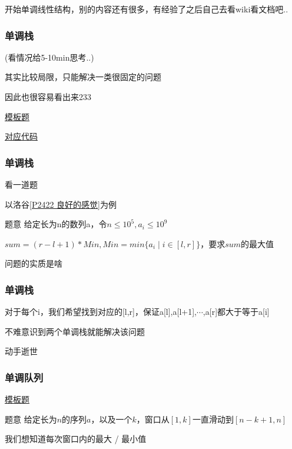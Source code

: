 \documentclass{beamer}
\begin{document}
  \begin{frame}

    开始单调线性结构，别的内容还有很多，有经验了之后自己去看wiki看文档吧..
    
    \vspace*{1\baselineskip}

    \frametitle{单调栈}

    (看情况给5-10min思考..)

    其实比较局限，只能解决一类很固定的问题

    因此也很容易看出来233

    \vspace*{1\baselineskip}
    
    \href{https://www.luogu.com.cn/problem/P5788}{模板题}

    \vspace*{1\baselineskip}

    \href{http://syh521.cn/file/monotone-stack.cpp}{对应代码}
  \end{frame}

  \begin{frame}


    \frametitle{单调栈}
    看一道题

    以洛谷\href{https://www.luogu.com.cn/problem/P2422}{[P2422 良好的感觉]}为例

    \begin{block}{题意}
      给定长为n的数列a，令$n\leq 10^5,a_i\leq 10^9$
  
      $sum=(r-l+1)*Min,Min=min\{a_i\mid i\in [l,r]\}$，要求$sum$的最大值

    \end{block}
    \pause
    问题的实质是啥
  \end{frame}

  \begin{frame}
    \frametitle{单调栈}
    
    对于每个i，我们希望找到对应的[l,r]，保证a[l],a[l+1],$\cdots$,a[r]都大于等于a[i]

    \pause

    \vspace*{1\baselineskip}
    
    不难意识到两个单调栈就能解决该问题
    
    \pause
    
    \vspace*{1\baselineskip}
    动手逝世
  \end{frame}

  \begin{frame}
    \frametitle{单调队列}

    \href{https://www.luogu.com.cn/problem/P1886}{模板题}

    \begin{block}{题意}
      给定长为$n$的序列$a$，以及一个$k$，窗口从$[1,k]$一直滑动到$[n-k+1,n]$

      我们想知道每次窗口内的最大 / 最小值
    \end{block}
  \end{frame}
\end{document}

